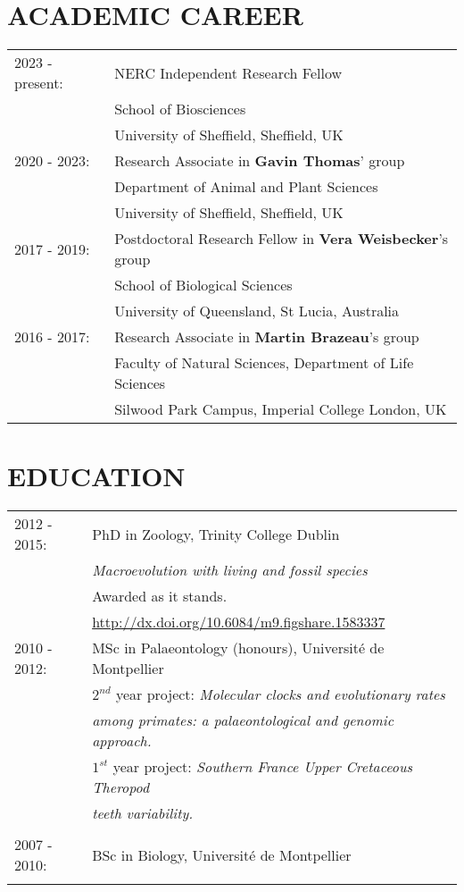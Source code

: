\documentclass[10pt,a4paper]{article}
\begin{document}
{\section{ACADEMIC CAREER}
\raggedright
\begin{tabular}{ll} 
2023 - present: & NERC Independent Research Fellow\\
& School of Biosciences \\
& University of Sheffield, Sheffield, UK \\
2020 - 2023: & Research Associate in \textbf{Gavin Thomas}' group\\
& Department of Animal and Plant Sciences \\
& University of Sheffield, Sheffield, UK \\
2017 - 2019: & Postdoctoral Research Fellow in \textbf{Vera Weisbecker}'s group\\
& School of Biological Sciences \\
& University of Queensland, St Lucia, Australia \\
2016 - 2017: & Research Associate in \textbf{Martin Brazeau}'s group\\ 
& Faculty of Natural Sciences, Department of Life Sciences \\
& Silwood Park Campus, Imperial College London, UK \\

\end{tabular}

\section{EDUCATION}
\raggedright
\begin{tabular}{ll} 
2012 - 2015: & PhD in Zoology, Trinity College Dublin\\
& \textit{Macroevolution with living and fossil species} \\
& Awarded as it stands. \\
& \href{http://figshare.com/articles/Macroevolution_with_living_and_fossil_species/1583337}{http://dx.doi.org/10.6084/m9.figshare.1583337} \\
2010 - 2012: & MSc in Palaeontology (honours), Universit\'{e} de Montpellier\\
& $2^{nd}$ year project: \textit{Molecular clocks and evolutionary rates}\\
& \textit{among primates: a palaeontological and genomic approach.} \\
& $1^{st}$ year project: \textit{Southern France Upper Cretaceous Theropod}\\
& \textit{teeth variability.} \\
& \\
2007 - 2010: & BSc in Biology, Universit\'{e} de Montpellier\\
& \\
\end{tabular}



}
\end{document}

